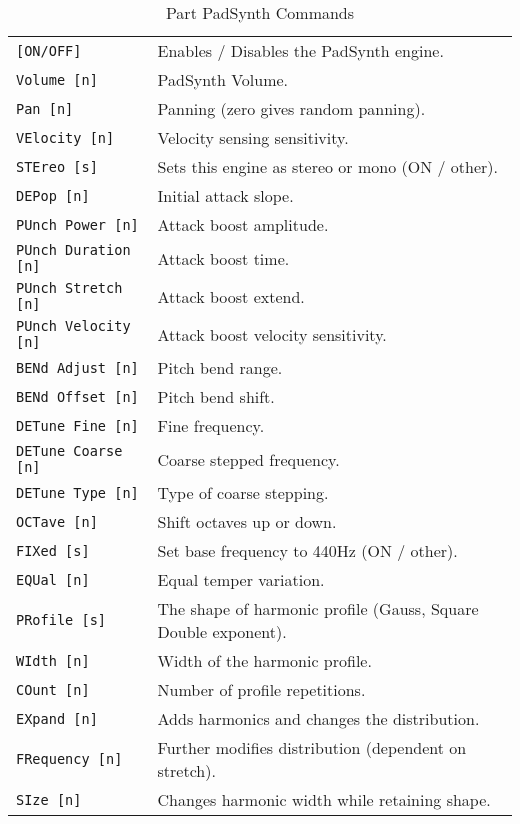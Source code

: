    \begin{table}[H]
      \centering
      \caption{Part PadSynth Commands}
      \label{table:yoshimi_part_padsynth_commands}
      \begin{tabular}{l l}
\texttt{[ON/OFF]} &
   Enables / Disables the PadSynth engine. \\
\texttt{Volume [n]} &
   PadSynth Volume. \\
\texttt{Pan [n]} &
   Panning (zero gives random panning).\\
\texttt{VElocity [n]} &
   Velocity sensing sensitivity. \\
\texttt{STEreo [s]} &
   Sets this engine as stereo or mono (ON / other). \\
\texttt{DEPop [n]} &
   Initial attack slope.   \\
\texttt{PUnch Power [n]} &
   Attack boost amplitude. \\
\texttt{PUnch Duration [n]} &
   Attack boost time. \\
\texttt{PUnch Stretch [n]} &
   Attack boost extend. \\
\texttt{PUnch Velocity [n]} &
   Attack boost velocity sensitivity. \\
\texttt{BENd Adjust [n]} &
   Pitch bend range. \\
\texttt{BENd Offset [n]} &
   Pitch bend shift. \\
\texttt{DETune Fine [n]} &
   Fine frequency. \\
\texttt{DETune Coarse [n]} &
   Coarse stepped frequency. \\
\texttt{DETune Type [n]} &
   Type of coarse stepping. \\
\texttt{OCTave [n]} &
   Shift octaves up or down. \\
\texttt{FIXed [s]} &
   Set base frequency to 440Hz (ON / other). \\
\texttt{EQUal [n]} &
   Equal temper variation. \\
\texttt{PRofile [s]} &
   The shape of harmonic profile (Gauss, Square Double exponent). \\
\texttt{WIdth [n]} &
   Width of the harmonic profile. \\
\texttt{COunt [n]} &
   Number of profile repetitions. \\
\texttt{EXpand [n]} &
   Adds harmonics and changes the distribution. \\
\texttt{FRequency [n]} &
   Further modifies distribution (dependent on stretch). \\
\texttt{SIze [n]} &
   Changes harmonic width while retaining shape. \\

\end{tabular}
\end{table}
